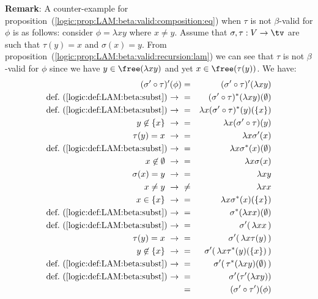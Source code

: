 \noindent
{\bf Remark}: A counter-example for
proposition~(\ref{logic:prop:LAM:beta:valid:composition:eq}) when $\tau$ is not
$\beta$-valid for $\phi$ is as follows: consider $\phi=\lambda x y$ where
$x\neq y$. Assume that $\sigma,\tau:V\to\tv$ are such that
$\tau(y)=x$ and $\sigma(x)=y$. From
proposition~(\ref{logic:prop:LAM:beta:valid:recursion:lam}) we can see that
$\tau$ is not $\beta$-valid for $\phi$ since we have $y\in\free(\lambda x y)$
and yet $x\in\free(\tau(y))$. We have:
    \begin{eqnarray*}(\sigma'\circ\tau)' (\phi)
        &=&(\sigma'\circ\tau)' (\lambda x y)\\
        \mbox{def.~(\ref{logic:def:LAM:beta:subst})\ $\to$\ }
        &=&(\sigma'\circ\tau)^{*} (\lambda x y)(\emptyset)\\
        \mbox{def.~(\ref{logic:def:LAM:beta:subst})\ $\to$\ }
        &=&\lambda x(\sigma'\circ\tau)^{*} (y)(\{x\})\\
        y\not\in\{x\}\ \to\ 
        &=&\lambda x(\sigma'\circ\tau) (y)\\
        \tau(y)=x\ \to\ 
        &=&\lambda x\sigma'(x)\\
        \mbox{def.~(\ref{logic:def:LAM:beta:subst})\ $\to$\ }
        &=&\lambda x\sigma^{*}(x)(\emptyset)\\
        x\not\in\emptyset\ \to\ 
        &=&\lambda x\sigma(x)\\
        \sigma(x)=y\ \to\ 
        &=&\lambda x y\\
        x\neq y\ \to\ 
        &\neq&\lambda x x\\
        x\in\{x\}\ \to\ 
        &=&\lambda x \sigma^{*}(x)(\{x\})\\
        \mbox{def.~(\ref{logic:def:LAM:beta:subst})\ $\to$\ }
        &=&\sigma^{*}(\lambda x x)(\emptyset)\\
        \mbox{def.~(\ref{logic:def:LAM:beta:subst})\ $\to$\ }
        &=&\sigma'(\,\lambda x x\,)\\
        \tau(y)=x\ \to\ 
        &=&\sigma'(\,\lambda x\tau(y)\,)\\
        y\not\in\{x\}\ \to\ 
        &=&\sigma'(\,\lambda x\tau^{*}(y)(\{x\})\,)\\
        \mbox{def.~(\ref{logic:def:LAM:beta:subst})\ $\to$\ }
        &=&\sigma'(\,\tau^{*}(\lambda x y)(\emptyset)\,)\\
        \mbox{def.~(\ref{logic:def:LAM:beta:subst})\ $\to$\ }
        &=&\sigma'(\tau'(\lambda x y))\\
        &=&(\sigma'\circ\tau')(\phi)
    \end{eqnarray*}

